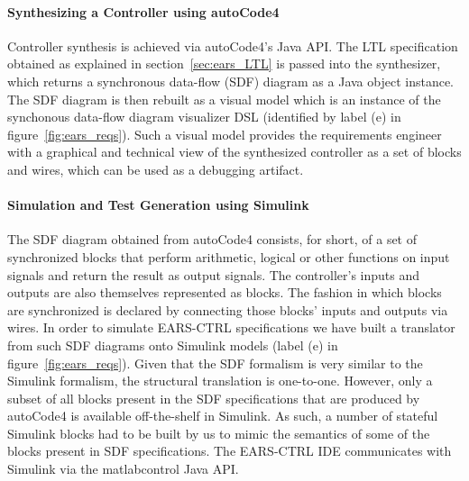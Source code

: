 \paragraph{\textbf{Synthesizing a Controller using \textsf{autoCode4}}\\}
\hspace{-.2cm}Controller synthesis is achieved via \textsf{autoCode4}'s Java
API. The LTL specification obtained as explained in section~\ref{sec:ears_LTL}
is passed into the synthesizer, which returns a synchronous data-flow (SDF)
diagram as a Java object instance. The SDF diagram is then rebuilt as a visual model
which is an instance of the synchonous data-flow diagram visualizer DSL
(identified by label (\textsf{e}) in figure~\ref{fig:ears_reqs}). Such a visual
model provides the requirements engineer with a graphical and technical view of
the synthesized controller as a set of blocks and wires, which can be used as a
debugging artifact.\vspace{-.2cm}
\paragraph{\textbf{Simulation and Test Generation using Simulink}\\}
\hspace{-.2cm}The SDF diagram obtained from \textsf{autoCode4} consists, for
short, of a set of synchronized blocks that perform arithmetic, logical or other functions
on input signals and return the result as output signals. The
controller's inputs and outputs are also themselves represented as blocks. The
fashion in which blocks are synchronized is declared by connecting those blocks'
inputs and outputs via wires. In order to simulate \textsf{EARS-CTRL}
specifications we have built a translator from such SDF diagrams onto Simulink
models (label (\textsf{e}) in figure~\ref{fig:ears_reqs}). Given that the SDF
formalism is very similar to the Simulink formalism, the structural translation is one-to-one. However, only a subset of all blocks
present in the SDF specifications that are produced by \textsf{autoCode4} is
available off-the-shelf in Simulink. As such, a number of stateful Simulink
blocks had to be built by us to mimic the semantics of some of the blocks
present in SDF specifications. The \textsf{EARS-CTRL} IDE
communicates with Simulink via the \textsf{matlabcontrol}\cite{mathlabcontrol}
Java API.\vspace{-.5cm}
